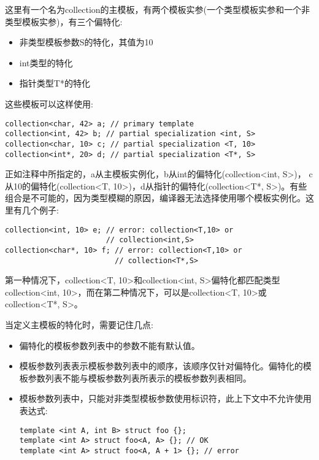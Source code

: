 这里有一个名为collection的主模板，有两个模板实参(一个类型模板实参和一个非类型模板实参)，有三个偏特化:

\begin{itemize}
\item 
非类型模板参数S的特化，其值为10

\item 
int类型的特化

\item 
指针类型T*的特化
\end{itemize}

这些模板可以这样使用:

\begin{lstlisting}[style=styleCXX]
collection<char, 42> a; // primary template
collection<int, 42> b; // partial specialization <int, S>
collection<char, 10> c; // partial specialization <T, 10>
collection<int*, 20> d; // partial specialization <T*, S>
\end{lstlisting}

正如注释中所指定的，a从主模板实例化，b从int的偏特化(collection<int, S>)， c从10的偏特化(collection<T, 10>)，d从指针的偏特化(collection<T*, S>)。有些组合是不可能的，因为类型模糊的原因，编译器无法选择使用哪个模板实例化。这里有几个例子:

\begin{lstlisting}[style=styleCXX]
collection<int, 10> e; // error: collection<T,10> or
                       // collection<int,S>
collection<char*, 10> f; // error: collection<T,10> or
                         // collection<T*,S>
\end{lstlisting}

第一种情况下，collection<T, 10>和collection<int, S>偏特化都匹配类型collection<int, 10>，而在第二种情况下，可以是collection<T, 10>或collection<T*, S>。

当定义主模板的特化时，需要记住几点:

\begin{itemize}
\item 
偏特化的模板参数列表中的参数不能有默认值。

\item 
模板参数列表表示模板参数列表中的顺序，该顺序仅针对偏特化。偏特化的模板参数列表不能与模板参数列表所表示的模板参数列表相同。

\item 
模板参数列表中，只能对非类型模板参数使用标识符，此上下文中不允许使用表达式:
\begin{lstlisting}[style=styleCXX]
template <int A, int B> struct foo {};
template <int A> struct foo<A, A> {}; // OK
template <int A> struct foo<A, A + 1> {}; // error
\end{lstlisting}
\end{itemize}

